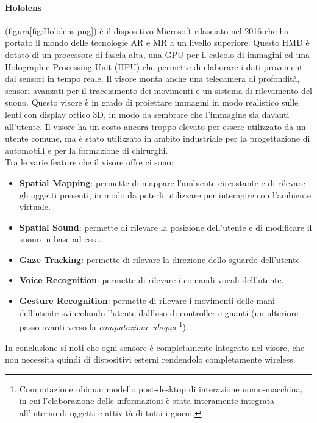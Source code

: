         \paragraph{Hololens} (figura\ref{fig:Hololens.png}) è il dispositivo Microsoft rilasciato nel 2016 che ha portato il mondo delle tecnologie 
            AR e MR a un livello superiore. Questo HMD è dotato di un processore di fascia alta, una GPU per il calcolo
            di immagini ed una Holographic Processing Unit (HPU) che permette di elaborare i dati provenienti dai sensori
            in tempo reale. Il visore monta anche una telecamera di profondità, sensori avanzati per il tracciamento dei
            movimenti e un sistema di rilevamento del suono. Questo visore è in grado di proiettare immagini in modo
            realistico sulle lenti con display ottico 3D, in modo da sembrare che l'immagine sia davanti all'utente.
            Il visore ha un costo ancora troppo elevato per essere utilizzato da un utente comune, ma è stato utilizzato
            in ambito industriale per la progettazione di automobili e per la formazione di chirurghi. \\
            Tra le varie feature che il visore offre ci sono:
            \begin{itemize}
                \item \textbf{Spatial Mapping}: permette di mappare l'ambiente circostante e di rilevare gli oggetti
                    presenti, in modo da poterli utilizzare per interagire con l'ambiente virtuale.
                \item \textbf{Spatial Sound}: permette di rilevare la posizione dell'utente e di modificare il suono in base
                    ad essa.
                \item \textbf{Gaze Tracking}: permette di rilevare la direzione dello sguardo dell'utente.
                \item \textbf{Voice Recognition}: permette di rilevare i comandi vocali dell'utente.
                \item \textbf{Gesture Recognition}: permette di rilevare i movimenti delle mani dell'utente svincolando
                    l'utente dall'uso di controller e guanti (un ulteriore passo avanti verso la \textit{computazione ubiqua}
                    \footnote{Computazione ubiqua: modello post-desktop di interazione uomo-macchina, in cui l'elaborazione
                    delle informazioni è stata interamente integrata all'interno di oggetti e attività di tutti i giorni.\cite{ubiCompWiki}}).
            \end{itemize}
            In conclusione si noti che ogni sensore è completamente integrato nel visore, che non necessita quindi di
            dispositivi esterni rendendolo completamente wireless.

